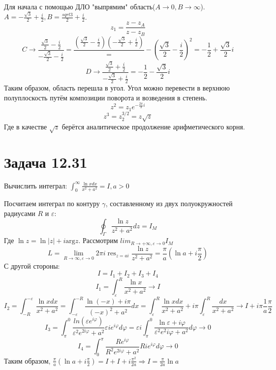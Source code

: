 \documentclass[11pt]{article}
\begin{document}
Для начала с помощью ДЛО "выпрямим" область(\(A \to 0, B \to \infty\)).
\(A = -\frac{\sqrt 3}2  + \frac{i}2, B = \frac{sqrt 3}2 + \frac{i}2\).
$$z_1 = \frac{z - z_A}{z - z_B}$$
$$C \to \frac{\frac{\sqrt 3}2 - \frac{i}2}{-\frac{\sqrt 3}2 - \frac{i}2} = \frac{(\frac{\sqrt 3}2 - \frac{i}2)(-\frac{\sqrt 3}2 + \frac{i}2)}
= -\left(\frac{\sqrt 3}2 - \frac{i}2\right)^2 = -\frac{1}2 + \frac{\sqrt 3}2i$$
$$D \to \frac{\frac{\sqrt 3}2 + \frac{i}2}{-\frac{\sqrt 3}2 + \frac{i}2} = -\frac{1}2 - \frac{\sqrt 3}2i$$
Таким образом, область перешла в угол. Угол можно перевести в верхнюю полуплоскость путём композиции поворота и возведения в степень.
$$z^2 = z_1e^{-\frac{2\pi}3i}$$
$$z^3 = z_2^{3/2} = z\sqrt z$$
Где в качестве \(\sqrt z\) берётся аналитическое продолжение арифметического корня.
\section{Задача 12.31}
\label{sec:org2c137b5}
Вычислить интеграл: \(\int_0^\infty\frac{\ln xdx}{x^2 + a^2} = I, a > 0\)

Посчитаем интеграл по контуру \(\gamma\), составленному из двух полуокружностей радиусами \(R\) и \(\varepsilon\):
$$\oint_\Gamma\frac{\ln z}{z^2 + a^2}dz = I_M$$
Где \(\ln z = \ln |z| + i\mathrm{arg} z\).
Рассмотрим \(lim_{R \to +\infty, \varepsilon \to 0}I_M\)
$$L  = \lim_{R \to \infty, \varepsilon \to 0}2\pi i\operatorname{res}_{z = ai}\frac{\ln z}{z^2 + a^2} = \frac{\pi}{a}\left(\ln a + i\frac{\pi}2\right)$$
С другой стороны:
$$I = I_1 + I_2 + I_3 + I_4$$
$$I_1 = \int_{\varepsilon}^R\frac{\ln x}{x^2 + a^2} \to I$$
$$I_2 = \int_{-R}^{-\varepsilon}\frac{\ln xdx}{x^2 + a^2} = \int_{-\varepsilon}^{-R}\frac{\ln(-x) + i\pi}{(-x)^2 + a^2}dx
= \int_\varepsilon^R\frac{\ln xdx}{x^2 + a^2} + i\pi\int_\varepsilon^R\frac{dx}{x^2 + a^2} \to I + i\pi\frac{1}a\frac{\pi}2$$
$$I_3 = \int_\pi^0\frac{ln(\varepsilon e^{i\varphi})}{\varepsilon^2e^{2i\varphi} + a^2}\varepsilon ie^{i\varphi}d\varphi
= \varepsilon i\int_\pi^0\frac{\ln \varepsilon + i\varphi}{\varepsilon^2e^2i\varphi + a^2}d\varphi \to 0$$
$$I_4 = \int_0^\pi\frac{Re^{i\varphi}}{R^2e^{2i\varphi} + a^2}Rie^{i\varphi}d\varphi \to 0$$
Таким образом, \(\frac{\pi}a\left(\ln a + i\frac{\pi}2\right) = I + I + i\frac{\pi^2}{2a} \Rightarrow I = \frac{\pi}{2a}\ln a\)
\end{document}
